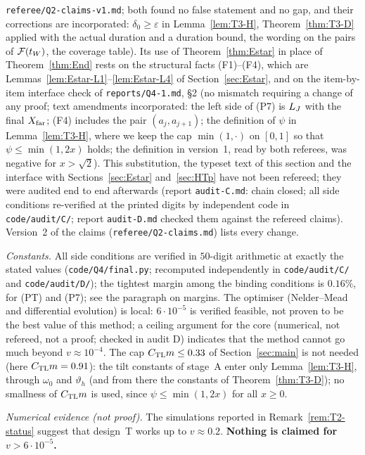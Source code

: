 \begin{remark}
\texttt{referee/\allowbreak Q2-claims-v1.md}; both found no false statement and no gap, and their corrections are incorporated: $\delta_0\ge\varepsilon$
in Lemma~\ref{lem:T3-H}, Theorem~\ref{thm:T3-D} applied with the actual duration and a duration bound, the wording on the pairs of
$\mathcal F(t_W)$, the coverage table). Its use of Theorem~\ref{thm:Estar} in place of Theorem~\ref{thm:End} rests on the structural facts
(F1)--(F4), which are Lemmas~\ref{lem:Estar-L1}--\ref{lem:Estar-L4} of Section~\ref{sec:Estar}, and on the item-by-item interface check
of \texttt{reports/\allowbreak Q4-1.md}, \S2 (no mismatch requiring a change of any proof; text amendments incorporated: the left side of (P7) is
$L_J$ with the final $X_{\mathrm{far}}$; (F4) includes the pair $(a_j,a_{j+1})$; the definition of $\psi$ in Lemma~\ref{lem:T3-H},
where we keep the cap $\min(1,\cdot)$ on $[0,1]$ so that $\psi\le\min(1,2x)$ holds; the definition in version~1, read by both
referees, was negative for $x>\sqrt2$). This substitution, the typeset text of this section and the interface with
Sections~\ref{sec:Estar} and~\ref{sec:HTp} have not been refereed; they were audited end to end afterwards (report
\texttt{audit-C.md}: chain closed; all side conditions re-verified at the printed digits by independent code in
\texttt{code/audit/C/}; report \texttt{audit-D.md} checked them against the refereed claims). Version~2 of the claims (\texttt{referee/\allowbreak Q2-claims.md}) lists every change.

\emph{Constants.} All side conditions are verified in $50$-digit arithmetic at exactly the stated values
(\texttt{code/Q4/final.py}; recomputed independently in \texttt{code/audit/C/} and \texttt{code/audit/D/}); the tightest margin among the binding conditions is $0.16\%$, for (PT) and (P7); see the paragraph on margins. The
optimiser (Nelder--Mead and differential evolution) is local: $6\cdot10^{-5}$ is verified feasible, not proven to be the best value
of this method; a ceiling argument for the core (numerical, not refereed, not a proof; checked in audit D) indicates that the
method cannot go much beyond $v\approx10^{-4}$. The cap $C_{\mathrm{TL}} m\le0.33$ of Section~\ref{sec:main} is not needed (here
$C_{\mathrm{TL}} m=0.91$): the tilt constants of stage~A enter only Lemma~\ref{lem:T3-H}, through $\omega_0$ and $\vartheta_h$ (and from there
the constants of Theorem~\ref{thm:T3-D}); no smallness of $C_{\mathrm{TL}} m$ is used, since $\psi\le\min(1,2x)$ for all $x\ge0$.

\emph{Numerical evidence (not proof).} The simulations reported in Remark~\ref{rem:T2-status} suggest that design~T works up to
$v\approx0.2$. \textbf{Nothing is claimed for $v>6\cdot10^{-5}$.}


\end{remark}
